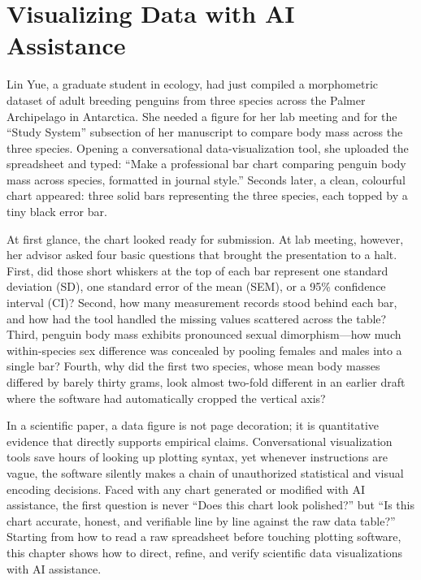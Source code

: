 \chapter{Visualizing Data with AI Assistance}

Lin Yue, a graduate student in ecology, had just compiled a morphometric dataset of adult breeding penguins from three species across the Palmer Archipelago in Antarctica. She needed a figure for her lab meeting and for the ``Study System'' subsection of her manuscript to compare body mass across the three species. Opening a conversational data-visualization tool, she uploaded the spreadsheet and typed: ``Make a professional bar chart comparing penguin body mass across species, formatted in journal style.'' Seconds later, a clean, colourful chart appeared: three solid bars representing the three species, each topped by a tiny black error bar.

At first glance, the chart looked ready for submission. At lab meeting, however, her advisor asked four basic questions that brought the presentation to a halt. First, did those short whiskers at the top of each bar represent one standard deviation (SD), one standard error of the mean (SEM), or a 95\% confidence interval (CI)? Second, how many measurement records stood behind each bar, and how had the tool handled the missing values scattered across the table? Third, penguin body mass exhibits pronounced sexual dimorphism—how much within-species sex difference was concealed by pooling females and males into a single bar? Fourth, why did the first two species, whose mean body masses differed by barely thirty grams, look almost two-fold different in an earlier draft where the software had automatically cropped the vertical axis?

In a scientific paper, a data figure is not page decoration; it is quantitative evidence that directly supports empirical claims. Conversational visualization tools save hours of looking up plotting syntax, yet whenever instructions are vague, the software silently makes a chain of unauthorized statistical and visual encoding decisions. Faced with any chart generated or modified with AI assistance, the first question is never ``Does this chart look polished?'' but ``Is this chart accurate, honest, and verifiable line by line against the raw data table?'' Starting from how to read a raw spreadsheet before touching plotting software, this chapter shows how to direct, refine, and verify scientific data visualizations with AI assistance.

